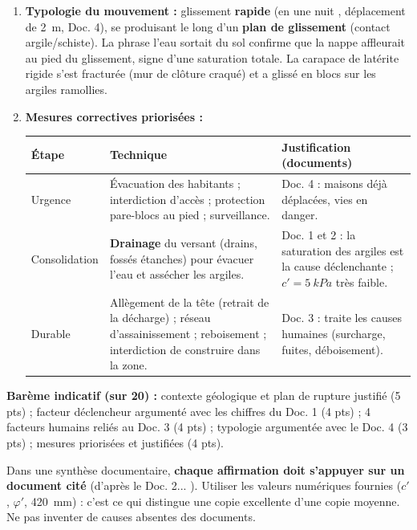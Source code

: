 \documentclass[11pt]{article}
\begin{document}
\begin{corrige}
\begin{enumerate}
\begin{enumerate}
      \item \textbf{Déboisement} : la disparition des eucalyptus a supprimé le pompage de l'eau par les racines et le maintien du sol par le maillage racinaire.
      \end{enumerate}
\item \textbf{Typologie du mouvement :} glissement \textbf{rapide} (\og en une nuit \fg, déplacement de \SI{2}{m}, Doc. 4), se produisant le long d'un \textbf{plan de glissement} (contact argile/schiste). La phrase \og l'eau sortait du sol \fg{} confirme que la nappe affleurait au pied du glissement, signe d'une saturation totale. La carapace de latérite rigide s'est fracturée (mur de clôture craqué) et a glissé en blocs sur les argiles ramollies.
\item \textbf{Mesures correctives priorisées :}
      \begin{center}
      \begin{tabularx}{\linewidth}{|l|X|X|}\hline
      \textbf{Étape} & \textbf{Technique} & \textbf{Justification (documents)} \\ \hline
      Urgence & Évacuation des habitants ; interdiction d'accès ; protection pare-blocs au pied ; surveillance. & Doc. 4 : maisons déjà déplacées, vies en danger. \\ \hline
      Consolidation & \textbf{Drainage} du versant (drains, fossés étanches) pour évacuer l'eau et assécher les argiles. & Doc. 1 et 2 : la saturation des argiles est la cause déclenchante ; $c' = \SI{5}{kPa}$ très faible. \\ \hline
      Durable & Allègement de la tête (retrait de la décharge) ; réseau d'assainissement ; reboisement ; interdiction de construire dans la zone. & Doc. 3 : traite les causes humaines (surcharge, fuites, déboisement). \\ \hline
      \end{tabularx}
      \end{center}
\end{enumerate}
\textbf{Barème indicatif (sur 20) :} contexte géologique et plan de rupture justifié (5 pts) ; facteur déclencheur argumenté avec les chiffres du Doc. 1 (4 pts) ; 4 facteurs humains reliés au Doc. 3 (4 pts) ; typologie argumentée avec le Doc. 4 (3 pts) ; mesures priorisées et justifiées (4 pts).
\end{corrige}
\begin{attention}
Dans une synthèse documentaire, \textbf{chaque affirmation doit s'appuyer sur un document cité} (\og d'après le Doc. 2... \fg). Utiliser les valeurs numériques fournies ($c'$, $\varphi'$, \SI{420}{mm}) : c'est ce qui distingue une copie excellente d'une copie moyenne. Ne pas inventer de causes absentes des documents.
\end{attention}
\end{document}
